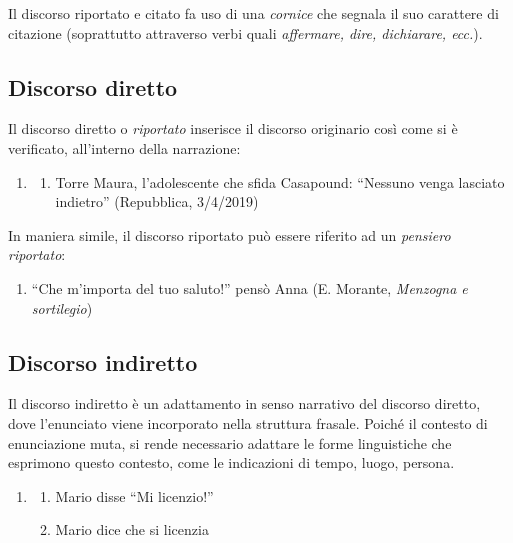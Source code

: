 \documentclass[
  a4paper,
  twoside,
  11pt,
  chapterprefix=false,
  bibliography=totocnumbered,
  listof=flat]{scrbook}
\providecommand{\tightlist}{%
  \setlength{\itemsep}{0pt}\setlength{\parskip}{0pt}}
\begin{document}
Il discorso riportato e citato fa uso di una \emph{cornice} che segnala il suo carattere di citazione (soprattutto attraverso verbi quali \emph{affermare, dire, dichiarare, ecc.}).

\hypertarget{discorso-diretto}{%
\subsection{Discorso diretto}\label{discorso-diretto}}

Il discorso diretto o \emph{riportato} inserisce il discorso originario così come si è verificato, all'interno della narrazione:

\begin{enumerate}
\def\labelenumi{(\arabic{enumi})}
\setcounter{enumi}{151}
\item
  \begin{enumerate}
  \def\labelenumii{\alph{enumii}.}
  \tightlist
  \item
    Torre Maura, l'adolescente che sfida Casapound: \enquote{Nessuno venga lasciato indietro} (Repubblica, 3/4/2019)
  \end{enumerate}
\end{enumerate}

In maniera simile, il discorso riportato può essere riferito ad un \emph{pensiero riportato}:

\begin{enumerate}
\def\labelenumi{(\arabic{enumi})}
\setcounter{enumi}{152}
\tightlist
\item
  \enquote{Che m'importa del tuo saluto!} pensò Anna (E. Morante, \emph{Menzogna e sortilegio})
\end{enumerate}

\hypertarget{discorso-indiretto}{%
\subsection{Discorso indiretto}\label{discorso-indiretto}}

Il discorso indiretto è un adattamento in senso narrativo del discorso diretto, dove l'enunciato viene incorporato nella struttura frasale. Poiché il contesto di enunciazione muta, si rende necessario adattare le forme linguistiche che esprimono questo contesto, come le indicazioni di tempo, luogo, persona.

\begin{enumerate}
\def\labelenumi{(\arabic{enumi})}
\setcounter{enumi}{153}
\item
  \begin{enumerate}
  \def\labelenumii{\alph{enumii}.}
  \tightlist
  \item
    Mario disse \enquote{Mi licenzio!}
  \item
    Mario dice che si licenzia
  \end{enumerate}
\end{enumerate}
\end{document}
